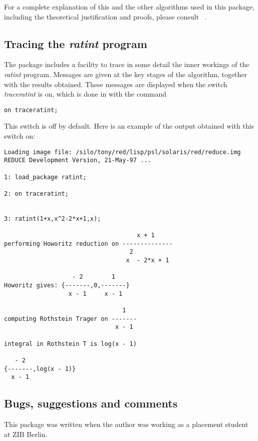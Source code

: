 For a complete explanation of this and the other algorithms used in this package, including the theoretical justification and proofs, please consult ~\cite{Geddes:92}.

\subsection{Tracing the \emph{ratint} program}
The package includes a facility to trace in some detail the inner workings of the \emph{ratint} program. Messages are given at the key stages of the algorithm, together with the results obtained. These messages are displayed when the switch \emph{traceratint} is on, which is done in \REDUCE with the command
\begin{verbatim}
on traceratint;
\end{verbatim}
This switch is off by default. Here is an example of the output obtained with this switch on:

\begin{verbatim}
Loading image file: /silo/tony/red/lisp/psl/solaris/red/reduce.img
REDUCE Development Version, 21-May-97 ...

1: load_package ratint;

2: on traceratint;


3: ratint(1+x,x^2-2*x+1,x);

                                     x + 1
performing Howoritz reduction on --------------
                                   2
                                  x  - 2*x + 1

                   - 2        1
Howoritz gives: {-------,0,-------}
                  x - 1     x - 1

                                 1
computing Rothstein Trager on -------
                               x - 1

integral in Rothstein T is log(x - 1)

   - 2
{-------,log(x - 1)}
  x - 1
\end{verbatim}

\subsection{Bugs, suggestions and comments}
This package was written when the author was working as a placement student at ZIB Berlin.
